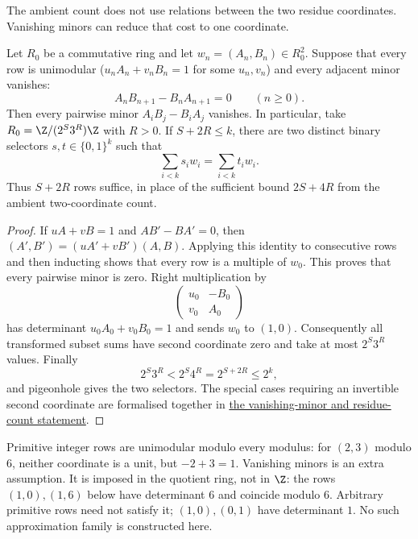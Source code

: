 \documentclass[11pt]{article}
\begin{document}
The ambient count does not use relations between the two residue
coordinates.  Vanishing minors can reduce that cost to one coordinate.

\begin{theorem}
\label{res:plucker-collapse}
Let $R_0$ be a commutative ring and let $w_n=(A_n,B_n)\in R_0^2$.  Suppose
that every row is unimodular ($u_n A_n+v_n B_n=1$ for some $u_n,v_n$) and every adjacent minor vanishes:
\[
 A_nB_{n+1}-B_nA_{n+1}=0\qquad(n\ge0).
\]
Then every pairwise minor $A_iB_j-B_iA_j$ vanishes.  In particular, take
$R_0=\Z/(2^S3^R)\Z$ with $R>0$.  If $S+2R\le k$, there are two distinct
binary selectors $s,t\in\{0,1\}^{k}$ such that
\[
 \sum_{i<k}s_iw_i=\sum_{i<k}t_iw_i.
\]
Thus $S+2R$ rows suffice, in place of the sufficient bound $2S+4R$
from the ambient two-coordinate count.
\end{theorem}

\begin{proof}
If $uA+vB=1$ and $AB'-BA'=0$, then
$(A',B')=(uA'+vB')(A,B)$. Applying this identity to consecutive rows
and then inducting shows that every row is a multiple of $w_0$.
This proves that every pairwise minor is zero. Right multiplication by
\[
 \begin{pmatrix}u_0&-B_0\\v_0&A_0\end{pmatrix}
\]
has determinant $u_0A_0+v_0B_0=1$ and sends $w_0$ to $(1,0)$.
Consequently all transformed subset sums have second coordinate zero
and take at most $2^S3^R$ values.  Finally
\[
 2^S3^R<2^S4^R=2^{S+2R}\le2^k,
\]
and pigeonhole gives the two selectors.
The special cases requiring an invertible second coordinate are
formalised together in \href{https://github.com/wcook04/plectis-erdos/blob/f36a98bf3d3e6f65f1074e3b800e3293d5b8a51a/ErdosProblems/Erdos1049/PaperFiniteAssembliesR7.lean#L269}{the vanishing-minor and residue-count statement}.
\end{proof}

Primitive integer rows are unimodular modulo every modulus: for
$(2,3)$ modulo $6$, neither coordinate is a unit, but $-2+3=1$.
Vanishing minors is an extra assumption. It is imposed in the quotient
ring, not in $\Z$: the rows $(1,0),(1,6)$ below have determinant $6$
and coincide modulo $6$. Arbitrary primitive rows need not satisfy it;
$(1,0),(0,1)$ have determinant $1$. No such approximation family is
constructed here.
\end{document}
